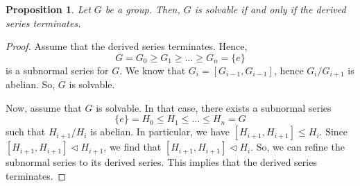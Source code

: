 \documentclass[a4paper, openany]{memoir}
\theoremstyle{definition}
\theoremstyle{plain}
\newtheorem{proposition}[definition]{Proposition}
\begin{document}
    \begin{proposition}
        Let $G$ be a group. Then, $G$ is solvable if and only if the derived series terminates.
    \end{proposition}
    \begin{proof}
        Assume that the derived series terminates. Hence,
        \[G = G_0 \geq G_1 \geq \dots \geq G_n = \{e\}\]
        is a subnormal series for $G$. We know that $G_i = [G_{i-1}, G_{i-1}]$, hence $G_i/G_{i+1}$ is abelian. So, $G$ is solvable.

        Now, assume that $G$ is solvable. In that case, there exists a subnormal series
        \[\{e\} = H_0 \leq H_1 \leq \dots \leq H_n = G\]
        such that $H_{i+1}/H_i$ is abelian. In particular, we have $[H_{i+1}, H_{i+1}] \leq H_i$. Since $[H_{i+1}, H_{i+1}] \vartriangleleft H_{i+1}$, we find that $[H_{i+1}, H_{i+1}] \vartriangleleft H_i$. So, we can refine the subnormal series to its derived series. This implies that the derived series terminates.
    \end{proof}
\end{document}
